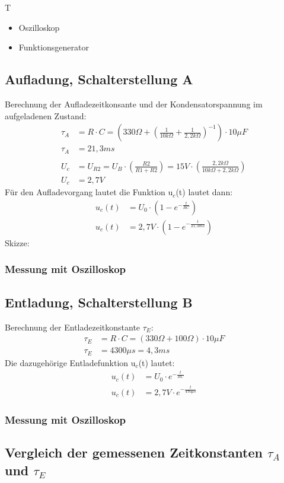 \documentclass{article}
\begin{document}
\begin{devlist}
    T
    \begin{itemize}
        \item Oszilloskop
        \item Funktionsgenerator
    \end{itemize}
\end{devlist}
\subsection{Aufladung, Schalterstellung A}
Berechnung der Aufladezeitkonsante und der Kondensatorspannung im aufgeladenen Zustand:
\begin{align*}
    \tau_A &= R\cdot C = (330\Omega + \left(\frac{1}{10k\Omega}+\frac{1}{2,2k\Omega}\right)^{-1}) \cdot 10\mu F\\
    \tau_A &= 21,3ms\\\\
    U_c &= U_{R2} = U_B \cdot \left(\frac{R2}{R1+R2}\right) = 15V \cdot \left(\frac{2,2k\Omega}{10k\Omega+2,2k\Omega}\right)\\
    U_c &= 2,7V
\end{align*}
Für den Aufladevorgang lautet die Funktion u$_c$(t) lautet dann:
\begin{align*}
    u_c(t)&= U_0 \cdot (1 - e^{-\frac{t}{RC}})\\
    u_c(t)&= 2,7V \cdot (1 - e^{-\frac{t}{21,3ms}})
\end{align*}
Skizze:
\subsubsection{Messung mit Oszilloskop}
 
\subsection{Entladung, Schalterstellung B}
Berechnung der Entladezeitkonstante $\tau_E$:
\begin{align*}
    \tau_E &= R\cdot C = (330\Omega + 100\Omega) \cdot 10\mu F \\
    \tau_E &= 4300\mu s = 4,3ms
\end{align*}
Die dazugehörige Entladefunktion u$_c$(t) lautet:
\begin{align*}
    u_c(t)&= U_0 \cdot e^{-\frac{t}{RC}}\\
    u_c(t)&= 2,7V \cdot e^{-\frac{t}{470\mu s}}
\end{align*}
\subsubsection{Messung mit Oszilloskop}
\subsection{Vergleich der gemessenen Zeitkonstanten $\tau_A$ und $\tau_E$}
\end{document}
